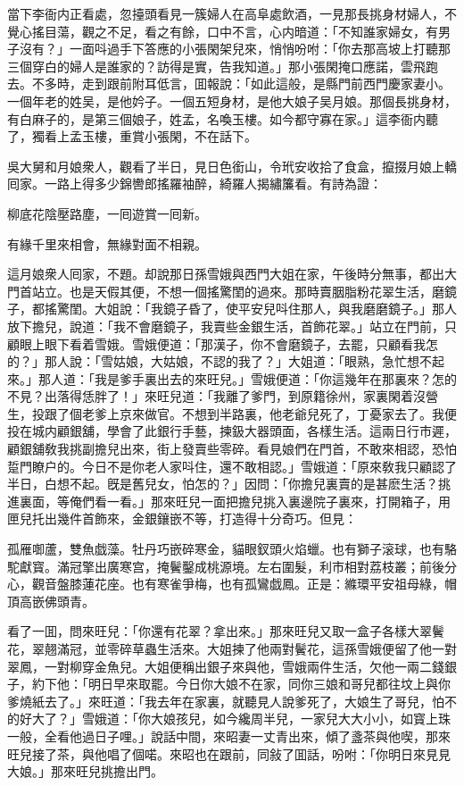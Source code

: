 當下李衙内正看處，忽擡頭看見一簇婦人在高阜處飲酒，一見那長挑身材婦人，不覺心搖目蕩，觀之不足，看之有餘，口中不言，心内暗道：「不知誰家婦女，有男子沒有？」一面呌過手下答應的小張閑架兒來，悄悄吩咐：「你去那高坡上打聽那三個穿白的婦人是誰家的？訪得是實，告我知道。」那小張閑掩口應諾，雲飛跑去。不多時，走到跟前附耳低言，囬報說：「如此這般，是縣門前西門慶家妻小。一個年老的姓吴，是他妗子。一個五短身材，是他大娘子吴月娘。那個長挑身材，有白麻子的，是第三個娘子，姓孟，名喚玉樓。如今都守寡在家。」這李衙内聽了，獨看上孟玉樓，重賞小張閑，不在話下。

吳大舅和月娘衆人，觀看了半日，見日色銜山，令玳安收拾了食盒，攛掇月娘上轎囘家。一路上得多少錦轡郎搖羅袖醉，綺羅人揭繡簾看。有詩為證：

\begin{myquote}
柳底花陰壓路塵，一囘遊賞一囘新。

有緣千里來相會，無緣對面不相親。
\end{myquote}

這月娘衆人囘家，不題。却說那日孫雪娥與西門大姐在家，午後時分無事，都出大門首站立。也是天假其便，不想一個搖驚閨的過來。那時賣胭脂粉花翠生活，磨鏡子，都搖驚閨。大姐說：「我鏡子昏了，使平安兒呌住那人，與我磨磨鏡子。」那人放下擔兒，說道：「我不會磨鏡子，我賣些金銀生活，首飾花翠。」站立在門前，只顧眼上眼下看着雪娥。雪娥便道：「那漢子，你不會磨鏡子，去罷，只顧看我怎的？」那人說：「雪姑娘，大姑娘，不認的我了？」大姐道：「眼熟，急忙想不起來。」那人道：「我是爹手裏出去的來旺兒。」雪娥便道：「你這幾年在那裏來？怎的不見？出落得恁胖了！」來旺兒道：「我離了爹門，到原籍徐州，家裏閑着沒營生，投跟了個老爹上京來做官。不想到半路裏，他老爺兒死了，丁憂家去了。我便投在城内顧銀舖，學會了此銀行手藝，揀鈒大器頭面，各樣生活。這兩日行市遲，顧銀舖敎我挑副擔兒出來，街上發賣些零碎。看見娘們在門首，不敢來相認，恐怕踅門瞭户的。今日不是你老人家呌住，還不敢相認。」雪娥道：「原來敎我只顧認了半日，白想不起。旣是舊兒女，怕怎的？」因問：「你擔兒裏賣的是甚麽生活？挑進裏面，等俺們看一看。」那來旺兒一面把擔兒挑入裏邊院子裏來，打開箱子，用匣兒托出幾件首飾來，金銀鑲嵌不等，打造得十分奇巧。但見：

\begin{myquote}
孤雁啣蘆，雙魚戯藻。牡丹巧嵌碎寒金，貓眼釵頭火焰蠟。也有獅子滚球，也有駱駝獻寳。滿冠擎出廣寒宫，掩鬢鑿成桃源境。左右圍髮，利市相對荔枝叢；前後分心，觀音盤膝蓮花座。也有寒雀爭梅，也有孤鸞戯鳳。正是：縧環平安祖母綠，帽頂高嵌佛頭青。
\end{myquote}

看了一囬，問來旺兒：「你還有花翠？拿出來。」那來旺兒又取一盒子各樣大翠鬢花，翠翹滿冠，並零碎草蟲生活來。大姐揀了他兩對鬢花，這孫雪娥便留了他一對翠鳳，一對柳穿金魚兒。大姐便稱出銀子來與他，雪娥兩件生活，欠他一兩二錢銀子，約下他：「明日早來取罷。今日你大娘不在家，同你三娘和哥兒都往坟上與你爹燒紙去了。」來旺道：「我去年在家裏，就聽見人說爹死了，大娘生了哥兒，怕不的好大了？」雪娥道：「你大娘孩兒，如今纔周半兒，一家兒大大小小，如寳上珠一般，全看他過日子哩。」說話中間，來昭妻一丈青出來，傾了盞茶與他喫，那來旺兒接了茶，與他唱了個喏。來昭也在跟前，同敍了囬話，吩咐：「你明日來見見大娘。」那來旺兒挑擔出門。

